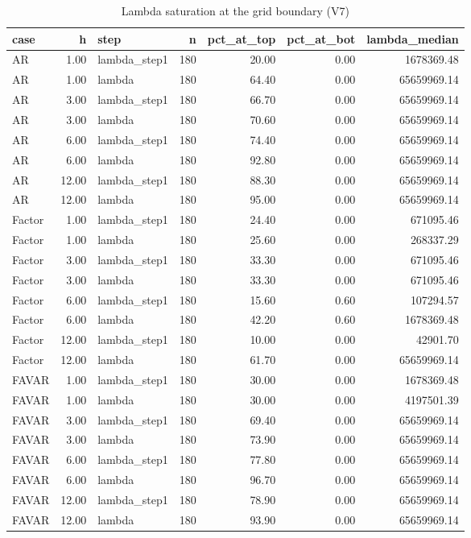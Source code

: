 \begin{table}[ht]
\centering
\begin{tabular}{lrlrrrr}
  \hline
case & h & step & n & pct\_at\_top & pct\_at\_bot & lambda\_median \\ 
  \hline
AR & 1.00 & lambda\_step1 & 180 & 20.00 & 0.00 & 1678369.48 \\ 
  AR & 1.00 & lambda & 180 & 64.40 & 0.00 & 65659969.14 \\ 
  AR & 3.00 & lambda\_step1 & 180 & 66.70 & 0.00 & 65659969.14 \\ 
  AR & 3.00 & lambda & 180 & 70.60 & 0.00 & 65659969.14 \\ 
  AR & 6.00 & lambda\_step1 & 180 & 74.40 & 0.00 & 65659969.14 \\ 
  AR & 6.00 & lambda & 180 & 92.80 & 0.00 & 65659969.14 \\ 
  AR & 12.00 & lambda\_step1 & 180 & 88.30 & 0.00 & 65659969.14 \\ 
  AR & 12.00 & lambda & 180 & 95.00 & 0.00 & 65659969.14 \\ 
  Factor & 1.00 & lambda\_step1 & 180 & 24.40 & 0.00 & 671095.46 \\ 
  Factor & 1.00 & lambda & 180 & 25.60 & 0.00 & 268337.29 \\ 
  Factor & 3.00 & lambda\_step1 & 180 & 33.30 & 0.00 & 671095.46 \\ 
  Factor & 3.00 & lambda & 180 & 33.30 & 0.00 & 671095.46 \\ 
  Factor & 6.00 & lambda\_step1 & 180 & 15.60 & 0.60 & 107294.57 \\ 
  Factor & 6.00 & lambda & 180 & 42.20 & 0.60 & 1678369.48 \\ 
  Factor & 12.00 & lambda\_step1 & 180 & 10.00 & 0.00 & 42901.70 \\ 
  Factor & 12.00 & lambda & 180 & 61.70 & 0.00 & 65659969.14 \\ 
  FAVAR & 1.00 & lambda\_step1 & 180 & 30.00 & 0.00 & 1678369.48 \\ 
  FAVAR & 1.00 & lambda & 180 & 30.00 & 0.00 & 4197501.39 \\ 
  FAVAR & 3.00 & lambda\_step1 & 180 & 69.40 & 0.00 & 65659969.14 \\ 
  FAVAR & 3.00 & lambda & 180 & 73.90 & 0.00 & 65659969.14 \\ 
  FAVAR & 6.00 & lambda\_step1 & 180 & 77.80 & 0.00 & 65659969.14 \\ 
  FAVAR & 6.00 & lambda & 180 & 96.70 & 0.00 & 65659969.14 \\ 
  FAVAR & 12.00 & lambda\_step1 & 180 & 78.90 & 0.00 & 65659969.14 \\ 
  FAVAR & 12.00 & lambda & 180 & 93.90 & 0.00 & 65659969.14 \\ 
   \hline
\end{tabular}
\caption{Lambda saturation at the grid boundary (V7)} 
\label{tab:lambda_saturation}
\end{table}
